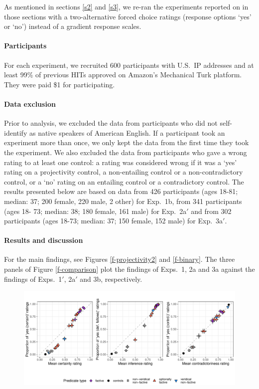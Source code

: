 \documentclass[11pt,fleqn]{article}
\newcommand{\6}{\mbox{$[\hspace*{-.6mm}[$}}
\newcommand{\9}{\mbox{$]\hspace*{-.6mm}]$}}
\begin{document}
{As mentioned in sections \ref{s2} and \ref{s3}, we re-ran the experiments reported on in those sections with a two-alternative forced choice ratings (response options `yes' or `no') instead of a gradient response scales. 

\paragraph{Participants} For each experiment, we recruited 600 participants with U.S.\ IP addresses and at least 99\% of previous HITs approved on Amazon's Mechanical Turk platform. They were paid \$1 for participating. 

\paragraph{Data exclusion} Prior to analysis, we excluded the data from participants who did not self-identify as native speakers of American English. If a participant took an experiment more than once, we only kept the data from the first time they took the experiment. We also excluded the data from participants who gave a wrong rating to at least one control: a rating was considered wrong if it was a `yes' rating on a projectivity control, a non-entailing control or a non-contradictory control, or a `no' rating on an entailing control or a contradictory control. The results presented below are based on data from 426 participants (ages 18-81; median: 37; 200 female, 220 male, 2 other) for Exp.~1b, from 341 participants (ages 18- 73; median: 38; 180 female, 161 male) for Exp.~2a$'$ and from 302 participants (ages 18-73; median: 37; 150 female, 152 male) for Exp.~3a$'$.

\paragraph{Results and discussion} For the main findings, see Figures \ref{f-projectivity2} and \ref{f-binary}. The three panels of Figure \ref{f-comparison} plot the findings of Exps.~1, 2a and 3a against the findings of Exps.~1$'$, 2a$'$ and 3b, respectively.
    

    
\begin{figure}[h!]
\centering
\includegraphics[width=.75\paperwidth]{../../results/compare-binary-nonbinary/graphs/joint-comparison-plot}
   

\end{figure}}
\end{document}
